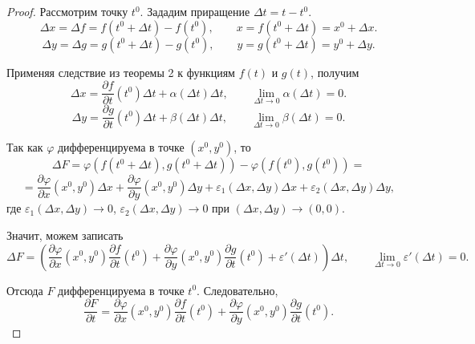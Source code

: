 \documentclass[12pt,a4paper]{report}
\begin{document}
\begin{proof}
    Рассмотрим точку $t^0$. Зададим приращение $\Delta t=t-t^0$.
    \[
    \Delta x=\Delta f=f(t^0+\Delta t)-f(t^0), \qquad x=f(t^0+\Delta t)=x^0+\Delta x.
    \]
    \[
    \Delta y=\Delta g=g(t^0+\Delta t)-g(t^0), \qquad y=g(t^0+\Delta t)=y^0+\Delta y.
    \]

    Применяя следствие из теоремы 2 к функциям $f(t)$ и $g(t)$, получим
    \[
    \Delta x=\frac{\partial f}{\partial t}(t^0)\Delta t+\alpha(\Delta t)\Delta t, \qquad
    \lim_{\Delta t\to0}\alpha(\Delta t)=0.
    \]
    \[
    \Delta y=\frac{\partial g}{\partial t}(t^0)\Delta t+\beta(\Delta t)\Delta t, \qquad
    \lim_{\Delta t\to0}\beta(\Delta t)=0.
    \]

    Так как $\varphi$ дифференцируема в точке $(x^0,y^0)$, то
    \[
    \Delta F=\varphi(f(t^0+\Delta t),g(t^0+\Delta t))-\varphi(f(t^0),g(t^0))=
    \]
    \[
    =\frac{\partial\varphi}{\partial x}(x^0,y^0)\Delta x+
    \frac{\partial\varphi}{\partial y}(x^0,y^0)\Delta y+
    \varepsilon_1(\Delta x,\Delta y)\Delta x+
    \varepsilon_2(\Delta x,\Delta y)\Delta y,
    \]
    где $\varepsilon_1(\Delta x,\Delta y)\to0$, $\varepsilon_2(\Delta x,\Delta y)\to0$ при $(\Delta x,\Delta y)\to(0,0)$.

    Значит, можем записать
    \[
    \Delta F=\left(
    \frac{\partial\varphi}{\partial x}(x^0,y^0)\frac{\partial f}{\partial t}(t^0)+
    \frac{\partial\varphi}{\partial y}(x^0,y^0)\frac{\partial g}{\partial t}(t^0)+
    \varepsilon'(\Delta t)\right)\Delta t,
    \qquad
    \lim_{\Delta t\to0}\varepsilon'(\Delta t)=0.
    \]

    Отсюда $F$ дифференцируема в точке $t^0$. Следовательно,
    \[
    \frac{\partial F}{\partial t}=
    \frac{\partial\varphi}{\partial x}(x^0,y^0)\frac{\partial f}{\partial t}(t^0)+
    \frac{\partial\varphi}{\partial y}(x^0,y^0)\frac{\partial g}{\partial t}(t^0).
    \]
\end{proof}

\end{document}
